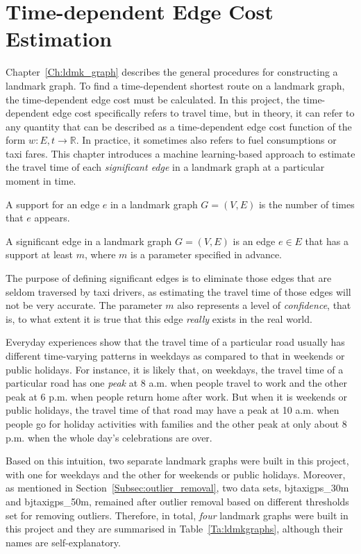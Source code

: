 \chapter{Time-dependent Edge Cost Estimation}
Chapter~\ref{Ch:ldmk_graph} describes the general procedures for constructing a landmark graph. To find a time-dependent shortest route on a landmark graph, the time-dependent edge cost must be calculated. In this project, the time-dependent edge cost specifically refers to travel time, but in theory, it can refer to any quantity that can be described as a time-dependent edge cost function of the form $w : E,t \rightarrow \mathbb{R}$. In practice, it sometimes also refers to fuel consumptions or taxi fares. This chapter introduces a machine learning-based approach to estimate the travel time of each \emph{significant edge} in a landmark graph at a particular moment in time. 

\begin{defn}
A support for an edge $e$ in a landmark graph $G=(V,E)$ is the number of times that $e$ appears. 
\end{defn}

\begin{defn}
A significant edge in a landmark graph $G=(V,E)$ is an edge $e \in E$ that has a support at least $m$, where $m$ is a parameter specified in advance.
\end{defn}

The purpose of defining significant edges is to eliminate those edges that are seldom traversed by taxi drivers, as estimating the travel time of those edges will not be very accurate. The parameter $m$ also represents a level of \emph{confidence}, that is, to what extent it is true that this edge \emph{really} exists in the real world. 

Everyday experiences show that the travel time of a particular road usually has different time-varying patterns in weekdays as compared to that in weekends or public holidays. For instance, it is likely that, on weekdays, the travel time of a particular road has one \emph{peak} at 8 a.m. when people travel to work and the other peak at 6 p.m. when people return home after work. But when it is weekends or public holidays, the travel time of that road may have a peak at 10 a.m. when people go for holiday activities with families and the other peak at only about 8 p.m. when the whole day's celebrations are over. 

Based on this intuition, two separate landmark graphs were built in this project, with one for weekdays and the other for weekends or public holidays. Moreover, as mentioned in Section~\ref{Subsec:outlier_removal}, 
two data sets, bjtaxigps\_30m and bjtaxigps\_50m, remained after outlier removal based on different thresholds set for removing outliers. Therefore, in total, \emph{four} landmark graphs were built in this project and they are summarised in Table~\ref{Ta:ldmkgraphs}, although their names are self-explanatory. 

